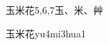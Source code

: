 \begin{entry}{玉米花}{5,6,7}{⽟、⽶、⾋}
  \begin{phonetics}{玉米花}{yu4mi3hua1}
  \end{phonetics}
\end{entry}
